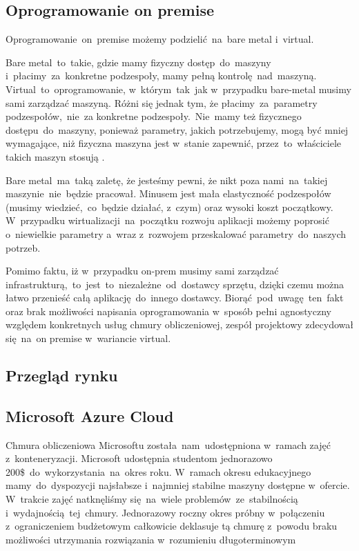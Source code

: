 \subsection{Oprogramowanie on premise}\label{subsec:oprogramowanie-on-premise}
Oprogramowanie~on~premise możemy podzielić~na~bare metal i~virtual.

Bare metal~to~takie, gdzie mamy fizyczny dostęp~do~maszyny i~płacimy~za~konkretne podzespoły, mamy pełną kontrolę~nad~maszyną.
Virtual~to~oprogramowanie, w~którym~tak~jak w~przypadku bare-metal musimy sami zarządzać maszyną.
Różni się jednak tym, że płacimy~za~parametry podzespołów,~nie~za konkretne podzespoły.~Nie~mamy też fizycznego dostępu~do~maszyny, ponieważ parametry, jakich potrzebujemy, mogą być mniej wymagające, niż fizyczna maszyna jest w~stanie zapewnić, przez~to~właściciele takich maszyn stosują .

Bare metal~ma~taką zaletę, że jesteśmy pewni, że nikt poza nami~na~takiej maszynie~nie~będzie pracował.
Minusem jest mała elastyczność podzespołów (musimy wiedzieć,~co~będzie działać, z~czym) oraz wysoki koszt początkowy.
W~przypadku wirtualizacji~na~początku rozwoju aplikacji możemy poprosić o~niewielkie parametry a~wraz z~rozwojem przeskalować parametry~do~naszych potrzeb.

Pomimo faktu, iż w~przypadku \gls{on-prem} musimy sami zarządzać infrastrukturą,~to~jest~to~niezależne~od~dostawcy sprzętu, dzięki czemu można łatwo przenieść całą aplikację~do~innego dostawcy.
Biorąć~pod~uwagę~ten~fakt oraz brak możliwości napisania oprogramowania w~sposób pełni agnostyczny względem konkretnych usług chmury obliczeniowej, zespół projektowy zdecydował się~na~on premise w~wariancie virtual.

\subsection{Przegląd rynku}\label{subsec:przeglad-rynku}

\subsection{Microsoft Azure Cloud}\label{subsec:microsoft-azure-cloud}
Chmura obliczeniowa Microsoftu została~nam~udostępniona w~ramach zajęć z~konteneryzacji.
Microsoft udostępnia studentom jednorazowo 200\$~do~wykorzystania~na~okres roku.
W~ramach okresu edukacyjnego mamy~do~dyspozycji najsłabsze i~najmniej stabilne maszyny dostępne w~ofercie.
W~trakcie zajęć natknęliśmy się~na~wiele problemów~ze~stabilnością i~wydajnością~tej~chmury.
Jednorazowy roczny okres próbny w~połączeniu z~ograniczeniem budżetowym całkowicie deklasuje tą chmurę z~powodu braku możliwości utrzymania rozwiązania w~rozumieniu długoterminowym

